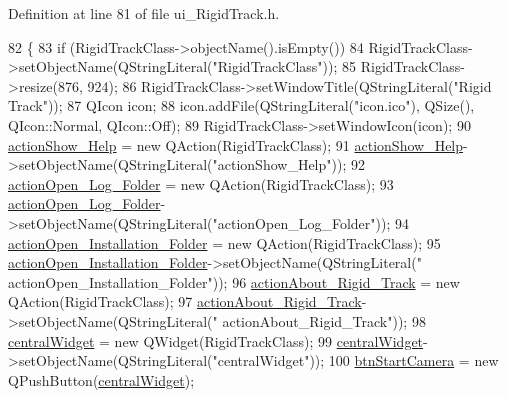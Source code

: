 Definition at line 81 of file ui\+\_\+\+Rigid\+Track.\+h.


\begin{DoxyCode}
82     \{
83         \textcolor{keywordflow}{if} (RigidTrackClass->objectName().isEmpty())
84             RigidTrackClass->setObjectName(QStringLiteral(\textcolor{stringliteral}{"RigidTrackClass"}));
85         RigidTrackClass->resize(876, 924);
86         RigidTrackClass->setWindowTitle(QStringLiteral(\textcolor{stringliteral}{"Rigid Track"}));
87         QIcon icon;
88         icon.addFile(QStringLiteral(\textcolor{stringliteral}{"icon.ico"}), QSize(), QIcon::Normal, QIcon::Off);
89         RigidTrackClass->setWindowIcon(icon);
90         \hyperlink{class_ui___rigid_track_class_aeb9fefc5e71112c520ae22f6e818d01f}{actionShow\_Help} = \textcolor{keyword}{new} QAction(RigidTrackClass);
91         \hyperlink{class_ui___rigid_track_class_aeb9fefc5e71112c520ae22f6e818d01f}{actionShow\_Help}->setObjectName(QStringLiteral(\textcolor{stringliteral}{"actionShow\_Help"}));
92         \hyperlink{class_ui___rigid_track_class_a3fb674ec6f96c57d3eef03900b7162ba}{actionOpen\_Log\_Folder} = \textcolor{keyword}{new} QAction(RigidTrackClass);
93         \hyperlink{class_ui___rigid_track_class_a3fb674ec6f96c57d3eef03900b7162ba}{actionOpen\_Log\_Folder}->setObjectName(QStringLiteral(\textcolor{stringliteral}{"actionOpen\_Log\_Folder"}));
94         \hyperlink{class_ui___rigid_track_class_adbf50ad17608dbfe8a688dc8f18d1ec3}{actionOpen\_Installation\_Folder} = \textcolor{keyword}{new} QAction(RigidTrackClass);
95         \hyperlink{class_ui___rigid_track_class_adbf50ad17608dbfe8a688dc8f18d1ec3}{actionOpen\_Installation\_Folder}->setObjectName(QStringLiteral(\textcolor{stringliteral}{"
      actionOpen\_Installation\_Folder"}));
96         \hyperlink{class_ui___rigid_track_class_adc074cede51e875e17c38bf23375550a}{actionAbout\_Rigid\_Track} = \textcolor{keyword}{new} QAction(RigidTrackClass);
97         \hyperlink{class_ui___rigid_track_class_adc074cede51e875e17c38bf23375550a}{actionAbout\_Rigid\_Track}->setObjectName(QStringLiteral(\textcolor{stringliteral}{"
      actionAbout\_Rigid\_Track"}));
98         \hyperlink{class_ui___rigid_track_class_ad0855ddf1efd8f0c8821dd2142f6221d}{centralWidget} = \textcolor{keyword}{new} QWidget(RigidTrackClass);
99         \hyperlink{class_ui___rigid_track_class_ad0855ddf1efd8f0c8821dd2142f6221d}{centralWidget}->setObjectName(QStringLiteral(\textcolor{stringliteral}{"centralWidget"}));
100         \hyperlink{class_ui___rigid_track_class_a72fc55bdb6021b52b9ec0e97e112d57d}{btnStartCamera} = \textcolor{keyword}{new} QPushButton(\hyperlink{class_ui___rigid_track_class_ad0855ddf1efd8f0c8821dd2142f6221d}{centralWidget});

\end{DoxyCode}
